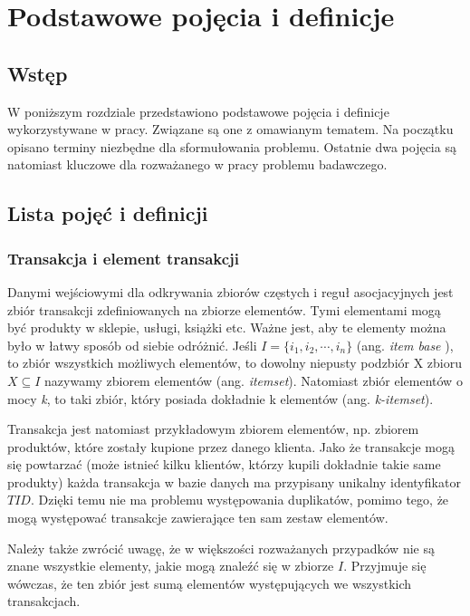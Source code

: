 \chapter{Podstawowe pojęcia i definicje}
\label{c2}

\section{Wstęp}
\label{c21}

W poniższym rozdziale przedstawiono podstawowe pojęcia i definicje wykorzystywane w pracy. Związane są one z omawianym tematem. Na początku opisano terminy niezbędne dla sformułowania problemu. Ostatnie dwa pojęcia są natomiast kluczowe dla rozważanego w pracy problemu badawczego.

\section{Lista pojęć i definicji}
\label{c22}

\subsection{Transakcja i element transakcji}
\label{c221}
Danymi wejściowymi dla odkrywania zbiorów częstych i reguł asocjacyjnych jest zbiór transakcji zdefiniowanych na zbiorze elementów. Tymi elementami mogą być produkty w sklepie, usługi, książki etc. Ważne jest, aby te elementy można było w łatwy sposób od siebie odróżnić. Jeśli \( I = \{ i_1, i_2, \cdots, i_n \}\)  (ang. \textit {item base} ), to zbiór wszystkich możliwych elementów, to dowolny niepusty podzbiór X zbioru \(X\subseteq I\) nazywamy zbiorem elementów (ang. \textit{itemset}). Natomiast zbiór elementów o mocy \textit{k}, to taki zbiór, który posiada dokładnie k elementów (ang. \textit{k-itemset}). 

Transakcja jest natomiast przykładowym zbiorem elementów, np. zbiorem produktów, które zostały kupione przez danego klienta. Jako że transakcje mogą się powtarzać (może istnieć kilku klientów, którzy kupili dokładnie takie same produkty) każda transakcja w bazie danych ma przypisany unikalny identyfikator \(TID\). Dzięki temu nie ma problemu występowania duplikatów, pomimo tego, że mogą występować transakcje zawierające ten sam zestaw elementów. 

Należy także zwrócić uwagę, że w większości rozważanych przypadków nie są znane wszystkie elementy, jakie mogą znaleźć się w zbiorze \(I\). Przyjmuje się wówczas, że ten zbiór jest sumą elementów występujących we wszystkich transakcjach.

